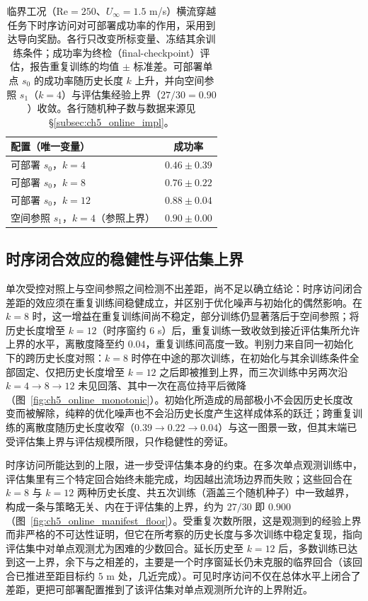 \begin{table}[htbp]
\centering
\caption{临界工况（$\mathrm{Re}=250$、$U_\infty=1.5$ m/s）横流穿越任务下时序访问对可部署成功率的作用，采用到达导向奖励。各行只改变所标变量、冻结其余训练条件；成功率为终检（final-checkpoint）评估，报告重复训练的均值 $\pm$ 标准差。可部署单点 $s_0$ 的成功率随历史长度 $k$ 上升，并向空间参照 $s_1$（$k=4$）与评估集经验上界（$27/30=0.90$）收敛。各行随机种子数与数据来源见 \S\ref{subsec:ch5_online_impl}。}
\label{tab:ch5_online_bottleneck}
\begin{tabular}{lc}
\toprule
\textbf{配置（唯一变量）} & \textbf{成功率} \\
\midrule
可部署 $s_0$，$k=4$ & $0.46 \pm 0.39$ \\
可部署 $s_0$，$k=8$ & $0.76 \pm 0.22$ \\
可部署 $s_0$，$k=12$ & $0.88 \pm 0.04$ \\
空间参照 $s_1$，$k=4$（参照上界） & $0.90 \pm 0.00$ \\
\bottomrule
\end{tabular}
\end{table}

\subsection{时序闭合效应的稳健性与评估集上界}\label{subsec:ch5_online_robustness}

单次受控对照上与空间参照之间检测不出差距，尚不足以确立结论：时序访问闭合差距的效应须在重复训练间稳健成立，并区别于优化噪声与初始化的偶然影响。在 $k=8$ 时，这一增益在重复训练间尚不稳定，部分训练仍显著落后于空间参照；将历史长度增至 $k=12$（时序窗约 $6$ s）后，重复训练一致收敛到接近评估集所允许上界的水平，离散度降至约 $0.04$，重复训练间高度一致。判别力来自同一初始化下的跨历史长度对照：$k=8$ 时停在中途的那次训练，在初始化与其余训练条件全部固定、仅把历史长度增至 $k=12$ 之后即被推到上界，而三次训练中另两次沿 $k=4\to8\to12$ 未见回落、其中一次在高位持平后微降（图~\ref{fig:ch5_online_monotonic}）。初始化所造成的局部极小不会因历史长度改变而被解除，纯粹的优化噪声也不会沿历史长度产生这样成体系的跃迁；跨重复训练的离散度随历史长度收窄（$0.39\to0.22\to0.04$）与这一图景一致，但其末端已受评估集上界与评估规模所限，只作稳健性的旁证。

时序访问所能达到的上限，进一步受评估集本身的约束。在多次单点观测训练中，评估集里有三个特定回合始终未能完成，均因越出流场边界而失败；这些回合在 $k=8$ 与 $k=12$ 两种历史长度、共五次训练（涵盖三个随机种子）中一致越界，构成一条与策略无关、内在于评估集的上界，约为 $27/30$ 即 $0.900$（图~\ref{fig:ch5_online_manifest_floor}）。受重复次数所限，这是观测到的经验上界而非严格的不可达性证明，但它在所考察的历史长度与多次训练中稳定复现，指向评估集中对单点观测尤为困难的少数回合。延长历史至 $k=12$ 后，多数训练已达到这一上界，余下与之相差的，主要是一个时序窗延长仍未克服的临界回合（该回合已推进至距目标约 $5$ m 处，几近完成）。可见时序访问不仅在总体水平上闭合了差距，更把可部署配置推到了该评估集对单点观测所允许的上界附近。

